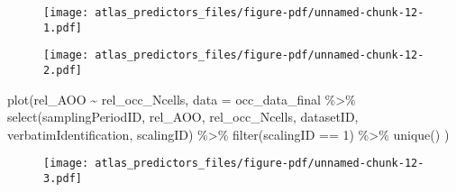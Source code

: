 \documentclass[
  letterpaper,
  DIV=11,
  numbers=noendperiod]{scrreprt}
\newenvironment{Shaded}{\begin{snugshade}}{\end{snugshade}}
\newcommand{\AttributeTok}[1]{\textcolor[rgb]{0.40,0.45,0.13}{#1}}
\newcommand{\DecValTok}[1]{\textcolor[rgb]{0.68,0.00,0.00}{#1}}
\newcommand{\FunctionTok}[1]{\textcolor[rgb]{0.28,0.35,0.67}{#1}}
\newcommand{\NormalTok}[1]{\textcolor[rgb]{0.00,0.23,0.31}{#1}}
\newcommand{\SpecialCharTok}[1]{\textcolor[rgb]{0.37,0.37,0.37}{#1}}
\begin{document}
\begin{Shaded}
\end{Shaded}

\begin{figure}[H]

{\centering \texttt{[image: atlas\_predictors\_files/figure-pdf/unnamed-chunk-12-1.pdf]}

}

\end{figure}

\begin{Shaded}
\end{Shaded}

\begin{figure}[H]

{\centering \texttt{[image: atlas\_predictors\_files/figure-pdf/unnamed-chunk-12-2.pdf]}

}

\end{figure}

\begin{Shaded}
\begin{Highlighting}[]
\FunctionTok{plot}\NormalTok{(rel\_AOO }\SpecialCharTok{\textasciitilde{}}\NormalTok{ rel\_occ\_Ncells,}
  \AttributeTok{data =}\NormalTok{ occ\_data\_final }\SpecialCharTok{\%\textgreater{}\%}
    \FunctionTok{select}\NormalTok{(samplingPeriodID, rel\_AOO, rel\_occ\_Ncells, datasetID, verbatimIdentification, scalingID) }\SpecialCharTok{\%\textgreater{}\%}
    \FunctionTok{filter}\NormalTok{(scalingID }\SpecialCharTok{==} \DecValTok{1}\NormalTok{) }\SpecialCharTok{\%\textgreater{}\%}
    \FunctionTok{unique}\NormalTok{()}
\NormalTok{)}
\end{Highlighting}
\end{Shaded}

\begin{figure}[H]

{\centering \texttt{[image: atlas\_predictors\_files/figure-pdf/unnamed-chunk-12-3.pdf]}

}

\end{figure}
\end{document}
